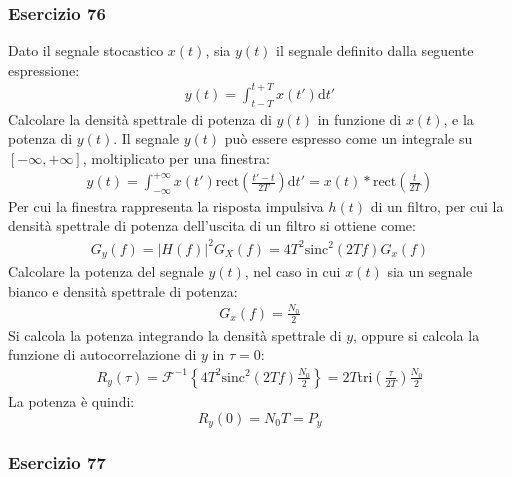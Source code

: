 \documentclass{article}
\newcommand{\rect}{\mathrm{rect}}
\newcommand{\sinc}{\mathrm{sinc}}
\newcommand{\df}{\mathrm{d}}
\begin{document}
\subsubsection*{Esercizio 76}

Dato il segnale stocastico $x(t)$, sia $y(t)$ il segnale definito dalla seguente espressione:
\begin{gather*}
    y(t)=\displaystyle\int_{t-T}^{t+T}x(t')\df t'
\end{gather*}
Calcolare la densità spettrale di potenza di $y(t)$ in funzione di $x(t)$, e la potenza di $y(t)$. 
Il segnale $y(t)$ può essere espresso come un integrale su $[-\infty,+\infty]$, moltiplicato per una finestra:
\begin{gather*}
    y(t)=\displaystyle\int_{-\infty}^{+\infty}x(t')\rect\left(\frac{t'-t}{2T}\right)\df t'=x(t)*\rect\left(\frac{t}{2T}\right)
\end{gather*}
Per cui la finestra rappresenta la risposta impulsiva $h(t)$ di un filtro, per cui la densità spettrale di potenza dell'uscita di un filtro si ottiene come:
\begin{gather}
    G_y(f)=|H(f)|^2G_X(f)=4T^2\sinc^2(2Tf)G_x(f)
\end{gather}
Calcolare la potenza del segnale $y(t)$, nel caso in cui $x(t)$ sia un segnale bianco e densità spettrale di potenza:
\begin{gather*}
    G_x(f)=\displaystyle\frac{N_0}{2}
\end{gather*}
Si calcola la potenza integrando la densità spettrale di $y$, oppure si calcola la funzione di autocorrelazione di $y$ in $\tau=0$:
\begin{gather*}
    R_y(\tau)=\mathscr{F}^{-1}\left\{4T^2\sinc^2(2Tf)\displaystyle\frac{N_0}{2}\right\}=2T\mathrm{tri}\left(\frac{\tau}{2T}\right)\frac{N_0}{2}
\end{gather*}
La potenza è quindi:
\begin{equation}
    R_y(0)=N_0T=P_y
\end{equation}

\subsubsection*{Esercizio 77}
\end{document}

